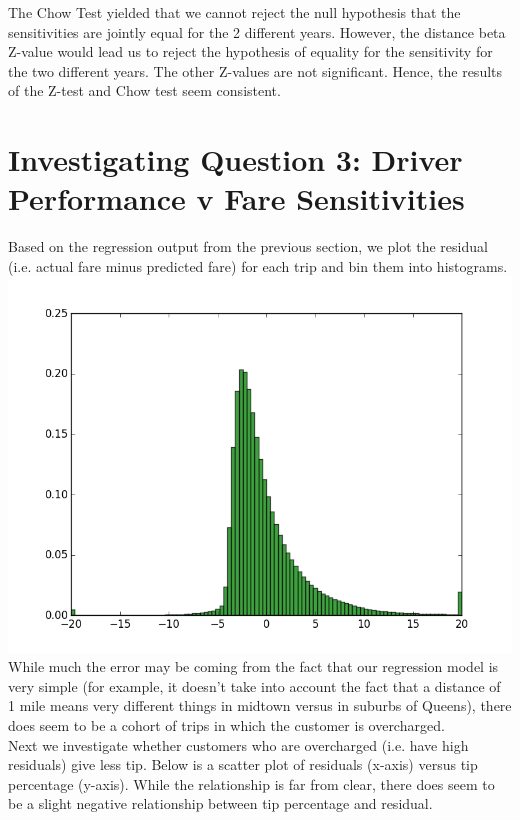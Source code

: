 \documentclass[twoside]{article}
\begin{document}
\begin{multicols}{2}
The Chow Test yielded that we cannot reject the null hypothesis that the sensitivities are jointly equal for the 2 different years. However, the distance beta Z-value would lead us to reject the hypothesis of equality for the sensitivity for the two different years. The other Z-values are not significant. Hence, the results of the Z-test and Chow test seem consistent. 


\section{Investigating Question 3: Driver Performance v Fare Sensitivities}
Based on the regression output from the previous section, we plot the residual (i.e. actual fare minus predicted fare) for each trip and bin them into histograms.  
\includegraphics[scale=.34]{figure_1.png}
While much the error may be coming from the fact that our regression model is very simple (for example, it doesn't take into account the fact that a distance of 1 mile means very different things in midtown versus in suburbs of Queens), there does seem to be a cohort of trips in which the customer is overcharged. \\
Next we investigate whether customers who are overcharged (i.e. have high residuals) give less tip. Below is a scatter plot of residuals (x-axis) versus tip percentage (y-axis). While the relationship is far from clear, there does seem to be a slight negative relationship between tip percentage and residual.

\end{multicols}
\end{document}
